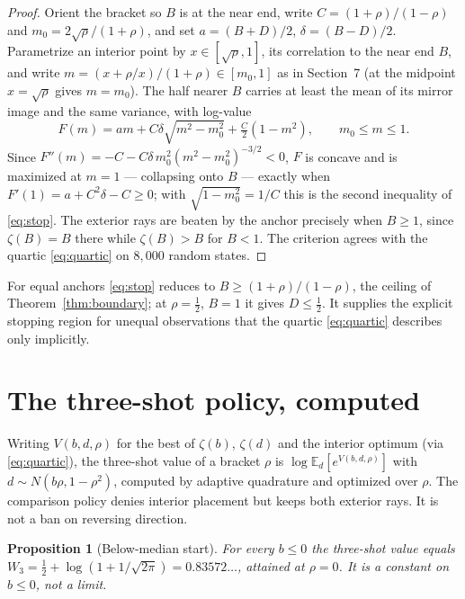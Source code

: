 \documentclass[11pt]{article}
\theoremstyle{itheads}
\newtheorem{proposition}{Proposition}
\newcommand{\E}{\mathbb{E}}
\begin{document}
\begin{proof}
Orient the bracket so $B$ is at the near end, write
$C=\left(1+\rho\right)/\left(1-\rho\right)$ and
$m_0=2\sqrt{\rho}/\left(1+\rho\right)$, and set $a=(B+D)/2$,
$\delta=(B-D)/2$. Parametrize an interior point by $x\in[\sqrt{\rho},1]$,
its correlation to the near end $B$, and write
$m=(x+\rho/x)/(1+\rho)\in[m_0,1]$ as in Section~7 (at the midpoint
$x=\sqrt{\rho}$ gives $m=m_0$). The half nearer $B$ carries at least the
mean of its mirror image and the same variance, with log-value
\begin{equation}
F(m)=am+C\delta\sqrt{m^{2}-m_0^{2}}+\tfrac{C}{2}\left(1-m^{2}\right),
\qquad m_0\le m\le 1.
\end{equation}
Since $F''(m)=-C-C\delta\,m_0^{2}\left(m^{2}-m_0^{2}\right)^{-3/2}<0$,
$F$ is concave and is maximized at $m=1$ --- collapsing onto $B$ ---
exactly when $F'(1)=a+C^{2}\delta-C\ge 0$; with
$\sqrt{1-m_0^{2}}=1/C$ this is the second inequality of
\eqref{eq:stop}. The exterior rays are beaten by the anchor precisely
when $B\ge 1$, since $\zeta(B)=B$ there while $\zeta(B)>B$ for $B<1$.
The criterion agrees with the quartic \eqref{eq:quartic} on
$8{,}000$ random states.
\end{proof}

\noindent For equal anchors \eqref{eq:stop} reduces to
$B\ge\left(1+\rho\right)/\left(1-\rho\right)$, the ceiling of
Theorem~\ref{thm:boundary}; at $\rho=\tfrac12$, $B=1$ it gives
$D\le\tfrac12$. It supplies the explicit stopping region for unequal
observations that the quartic \eqref{eq:quartic} describes only
implicitly.

\section{The three-shot policy, computed}

Writing $V\left(b,d,\rho\right)$ for the best of $\zeta(b)$,
$\zeta(d)$ and the interior optimum (via \eqref{eq:quartic}), the
three-shot value of a bracket $\rho$ is
$\log\E_d\!\left[e^{V\left(b,d,\rho\right)}\right]$ with
$d\sim N\!\left(b\rho,1-\rho^{2}\right)$, computed by adaptive
quadrature and optimized over $\rho$. The comparison policy denies interior placement but keeps both
exterior rays. It is not a ban on reversing direction.

\begin{proposition}[Below-median start]\label{prop:below}
For every $b\le 0$ the three-shot value equals
$W_3=\tfrac12+\log\!\left(1+1/\sqrt{2\pi}\right)=0.83572\ldots$,
attained at $\rho=0$. It is a constant on $b\le 0$, not a limit.
\end{proposition}
\end{document}

